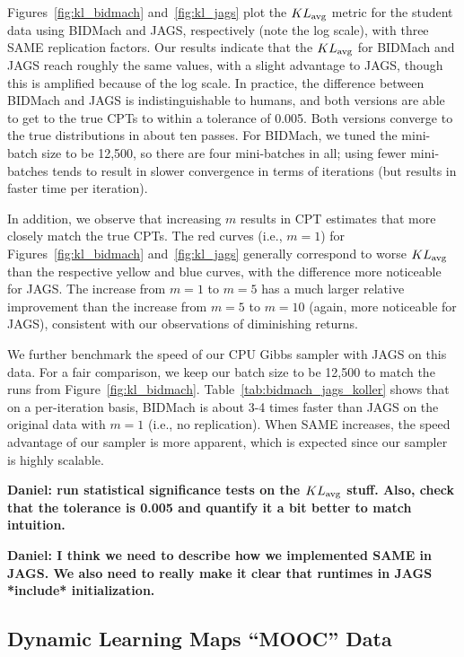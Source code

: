 \documentclass{article} %
\begin{document}
Figures~\ref{fig:kl_bidmach} and~\ref{fig:kl_jags} plot the $KL_{\rm avg}$ metric for the student
data using BIDMach and JAGS, respectively (note the log scale), with three SAME replication factors.
Our results indicate that the $KL_{\rm avg}$ for BIDMach and JAGS reach roughly the same values,
with a slight advantage to JAGS, though this is amplified because of the log scale. In practice, the
difference between BIDMach and JAGS is indistinguishable to humans, and both versions are able to
get to the true CPTs to within a tolerance of 0.005. Both versions converge to the true
distributions in about ten passes. For BIDMach, we tuned the mini-batch size to be 12,500, so there
are four mini-batches in all; using fewer mini-batches tends to result in slower convergence in
terms of iterations (but results in faster time per iteration).

In addition, we observe that increasing $m$ results in CPT estimates that more closely match the
true CPTs. The red curves (i.e., $m=1$) for Figures~\ref{fig:kl_bidmach} and~\ref{fig:kl_jags}
generally correspond to worse $KL_{\rm avg}$ than the respective yellow and blue curves, with the
difference more noticeable for JAGS. The increase from $m=1$ to $m=5$ has a much larger relative
improvement than the increase from $m=5$ to $m=10$ (again, more noticeable for JAGS), consistent
with our observations of diminishing returns.

We further benchmark the speed of our CPU Gibbs sampler with JAGS on this data. For a fair
comparison, we keep our batch size to be 12,500 to match the runs from Figure~\ref{fig:kl_bidmach}.
Table~\ref{tab:bidmach_jags_koller} shows that on a per-iteration basis, BIDMach is about 3-4 times
faster than JAGS on the original data with $m=1$ (i.e., no replication). When SAME increases, the
speed advantage of our sampler is more apparent, which is expected since our sampler is highly 
scalable.

\textbf{Daniel: run statistical significance tests on the $KL_{\rm avg}$ stuff. Also, check that the
tolerance is 0.005 and quantify it a bit better to match intuition.}

\textbf{Daniel: I think we need to describe how we implemented SAME in JAGS. We also need to really
make it clear that runtimes in JAGS *include* initialization.}

\subsection{Dynamic Learning Maps ``MOOC'' Data}\label{ssec:mooc_data}
\end{document}
